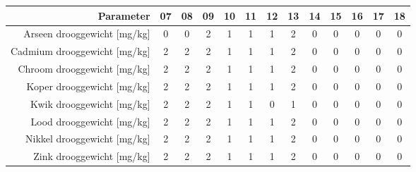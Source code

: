 \begin{tabular}{ r |c | c | c | c | c |c | c | c | c | c | c | c } 
\rowcolor[HTML]{EFEFEF}  
 Parameter & 07 & 08 & 09 & 10 & 11 & 12 & 13 & 14 & 15 & 16 & 17 & 18 \\    \hline     
Arseen drooggewicht [mg/kg] &0 & 0 & 2 & 1 & 1 & 1 & 2 & 0 & 0 & 0 & 0 & 0 \\
Cadmium drooggewicht [mg/kg] &2 & 2 & 2 & 1 & 1 & 1 & 2 & 0 & 0 & 0 & 0 & 0 \\
Chroom drooggewicht [mg/kg] &2 & 2 & 2 & 1 & 1 & 1 & 2 & 0 & 0 & 0 & 0 & 0 \\
Koper drooggewicht [mg/kg] &2 & 2 & 2 & 1 & 1 & 1 & 2 & 0 & 0 & 0 & 0 & 0 \\
Kwik drooggewicht [mg/kg] &2 & 2 & 2 & 1 & 1 & 0 & 1 & 0 & 0 & 0 & 0 & 0 \\
Lood drooggewicht [mg/kg] &2 & 2 & 2 & 1 & 1 & 1 & 2 & 0 & 0 & 0 & 0 & 0 \\
Nikkel drooggewicht [mg/kg] &2 & 2 & 2 & 1 & 1 & 1 & 2 & 0 & 0 & 0 & 0 & 0 \\
Zink drooggewicht [mg/kg] &2 & 2 & 2 & 1 & 1 & 1 & 2 & 0 & 0 & 0 & 0 & 0 \\
\end{tabular}    
